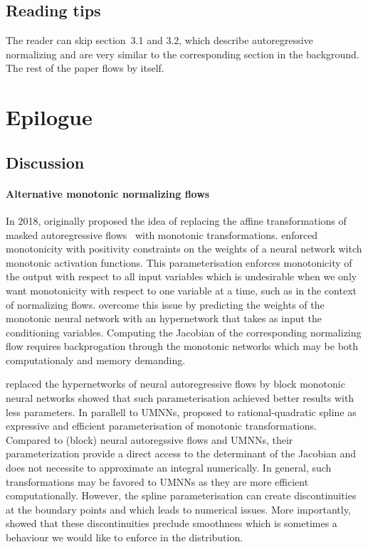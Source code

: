 \subsection{Reading tips}
The reader can skip section~3.1 and 3.2, which describe autoregressive normalizing and are very similar to the corresponding section in the background. The rest of the paper flows by itself.



\section{Epilogue} \label{epi:ch05}
\subsection{Discussion}
\paragraph{Alternative monotonic normalizing flows}
In 2018, \citet{huang_neural_2018} originally proposed the idea of replacing the affine transformations of masked autoregressive flows~\citep{papamakarios_masked_2017} with monotonic transformations. \citet{huang_neural_2018} enforced monotonicity with positivity constraints on the weights of a neural network witch monotonic activation functions. This parameterisation enforces monotonicity of the output with respect to all input variables which is undesirable when we only want monotonicity with respect to one variable at a time, such as in the context of normalizing flows. \citet{huang_neural_2018} overcome this issue by predicting the weights of the monotonic neural network with an hypernetwork that takes as input the conditioning variables. Computing the Jacobian of the corresponding normalizing flow requires backprogation through the monotonic networks which may be both computationaly and memory demanding.

\citet{de_cao_block_2020} replaced the hypernetworks of neural autoregressive flows by block monotonic neural networks showed that such parameterisation achieved better results with less parameters. In parallell to UMNNs, \citet{durkan_neural_2019} proposed to rational-quadratic spline as expressive and efficient parameterisation of monotonic transformations. Compared to (block) neural autoregssive flows and UMNNs, their parameterization provide a direct access to the determinant of the Jacobian and does not necessite to approximate an integral numerically. In general, such transformations may be favored to UMNNs as they are more efficient computationally. However, the spline parameterisation can create discontinuities at the boundary points and which leads to numerical issues. More importantly, \citet{kohler2021smooth} showed that these discontinuities preclude smoothness which is sometimes a behaviour we would like to enforce in the distribution.

